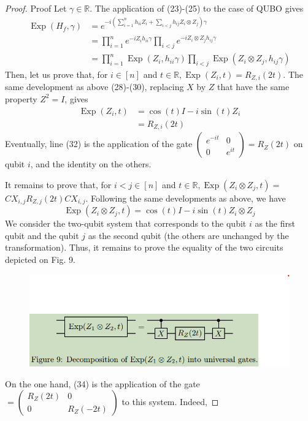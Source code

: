 \begin{proof}
    Proof Let $\gamma \in \mathbb{R}$. The application of (23)-(25) to the case of QUBO gives
\begin{equation}
\begin{aligned}
\operatorname{Exp}\left(H_{f}, \gamma\right) & =e^{-i\left(\sum_{i=1}^{n} h_{i i} Z_{i}+\sum_{i<j} h_{i j} Z_{i} \otimes Z_{j}\right) \gamma} \\
& =\prod_{i=1}^{n} e^{-i Z_{i} h_{i i} \gamma} \prod_{i<j} e^{-i Z_{i} \otimes Z_{j} h_{i j} \gamma} \\
& =\prod_{i=1}^{n} \operatorname{Exp}\left(Z_{i}, h_{i i} \gamma\right) \prod_{i<j} \operatorname{Exp}\left(Z_{i} \otimes Z_{j}, h_{i j} \gamma\right)
\end{aligned}
\end{equation}
Then, let us prove that, for $i \in[n]$ and $t \in \mathbb{R}, \operatorname{Exp}\left(Z_{i}, t\right)=R_{Z, i}(2 t)$. The same development as above (28)-(30), replacing $X$ by $Z$ that have the same property $Z^{2}=I$, gives
\begin{align}
\operatorname{Exp}\left(Z_{i}, t\right) & =\cos (t) I-i \sin (t) Z_{i}  \tag{32}\\
& =R_{Z, i}(2 t) \tag{33}
\end{align}
Eventually, line (32) is the application of the gate $\left(\begin{array}{cc}e^{-i t} & 0 \\ 0 & e^{i t}\end{array}\right)=R_{Z}(2 t)$ on qubit $i$, and the identity on the others.

It remains to prove that, for $i<j \in[n]$ and $t \in \mathbb{R}, \operatorname{Exp}\left(Z_{i} \otimes Z_{j}, t\right)=$ $C X_{i, j} R_{Z, j}(2 t) C X_{i, j}$. Following the same developments as above, we have
\begin{equation}
    \operatorname{Exp}\left(Z_{i} \otimes Z_{j}, t\right)=\cos (t) I-i \sin (t) Z_{i} \otimes Z_{j} \tag{34}
\end{equation}
We consider the two-qubit system that corresponds to the qubit $i$ as the first qubit and the qubit $j$ as the second qubit (the others are unchanged by the transformation). Thus, it remains to prove the equality of the two circuits depicted on Fig. 9.
\begin{figure}[ht]
    \centering
    \includegraphics[width=0.75\linewidth]{Images/grange23-f9.png}
\end{figure}
On the one hand, (34) is the application of the gate $=\left(\begin{array}{cc}R_{Z}(2 t) & 0 \\ 0 & R_{Z}(-2 t)\end{array}\right)$ to this system. Indeed,


\end{proof}
